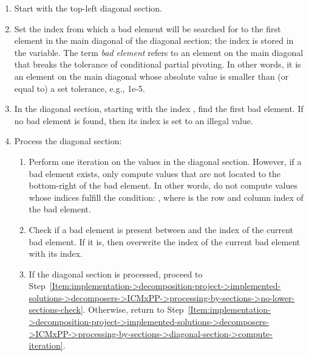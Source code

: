\begin{enumerate}
	\item \label{Item:implementation->decomposition-project->implemented-solutions->decomposers->ICMxPP->processing-by-sections->diagonal-section->start-at-top-left-diagonal-section}
		Start with the top-left diagonal section.
	\item \label{Item:implementation->decomposition-project->implemented-solutions->decomposers->ICMxPP->processing-by-sections->diagonal-section->reset-previous-bad-element}
		Set the index from which a bad element will be searched for to the first element in the main diagonal of the diagonal section; the index is stored in the  variable. The term \textit{bad element} refers to an element on the main diagonal that breaks the tolerance of conditional partial pivoting. In other words, it is an element on the main diagonal whose absolute value is smaller than (or equal to) a set tolerance, e.g., 1e-5.
	\item \label{Item:implementation->decomposition-project->implemented-solutions->decomposers->ICMxPP->processing-by-sections->diagonal-section->find-first-bad-element}
		In the diagonal section, starting with the index , find the first bad element.  If no bad element is found, then its index is set to an illegal value.
	\item \label{Item:implementation->decomposition-project->implemented-solutions->decomposers->ICMxPP->processing-by-sections->diagonal-section->process-diagonal-section}
		Process the diagonal section:
		\begin{enumerate}
			\item \label{Item:implementation->decomposition-project->implemented-solutions->decomposers->ICMxPP->processing-by-sections->diagonal-section->compute-iteration}
				Perform one iteration on the values in the diagonal section. However, if a bad element exists, only compute values that are not located to the bottom-right of the bad element. In other words, do not compute values whose indices fulfill the condition: , where  is the row and column index of the bad element.
			\item Check if a bad element is present between  and the index of the current bad element. If it is, then overwrite the index of the current bad element with its index.
			\item If the diagonal section is processed, proceed to Step~\ref{Item:implementation->decomposition-project->implemented-solutions->decomposers->ICMxPP->processing-by-sections->no-lower-sections-check}. Otherwise, return to Step~\ref{Item:implementation->decomposition-project->implemented-solutions->decomposers->ICMxPP->processing-by-sections->diagonal-section->compute-iteration}.

\end{enumerate}
\end{enumerate}
